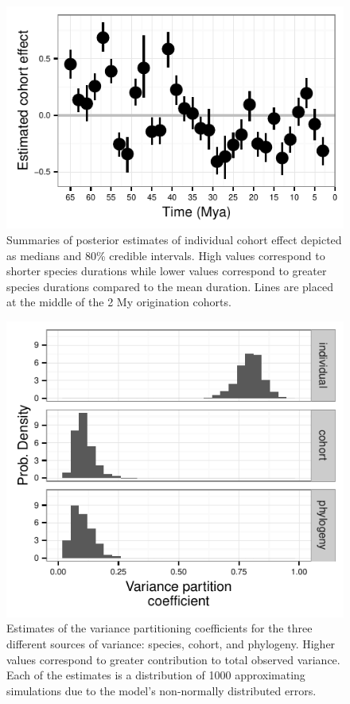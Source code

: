 \documentclass{pnastwo}
\begin{document}
\begin{figure}[ht]
  \label{fig:trait_est}
\end{figure}

\begin{figure}[ht]
  \centering
  \includegraphics{figure/cohort_est}
  \caption{Summaries of posterior estimates of individual cohort effect depicted as medians and 80\% credible intervals. High values correspond to shorter species durations while lower values correspond to greater species durations compared to the mean duration. Lines are placed at the middle of the 2 My origination cohorts.}
  \label{fig:eff_cohort}
\end{figure}

\begin{figure}[ht]
  \centering
  \includegraphics{figure/variance_est}
  \caption{Estimates of the variance partitioning coefficients for the three different sources of variance: species, cohort, and phylogeny. Higher values correspond to greater contribution to total observed variance. Each of the estimates is a distribution of 1000 approximating simulations due to the model's non-normally distributed errors.}
  \label{fig:vpc}
\end{figure}


\end{document}
